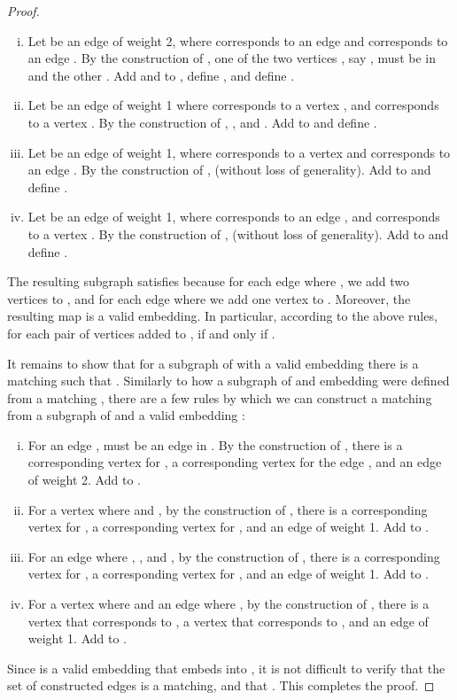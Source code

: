 \documentclass[11pt]{article}
\begin{document}
\begin{proof}
\begin{enumerate}[(i)]
  \item Let  be an edge of weight 2, where  corresponds to an edge  and  corresponds to an edge . By the construction of , one of the two vertices , say , must be in  and the other .  Add  and  to , define , and define .
  \item Let  be an edge of weight 1 where  corresponds to a vertex , and  corresponds to a vertex .  By the construction of , , and .  Add  to  and define .
  \item Let  be an edge of weight 1, where  corresponds to a vertex  and  corresponds to an edge . By the construction of ,  (without loss of generality).  Add  to  and define .
  \item Let  be an edge of weight 1, where  corresponds to an edge , and  corresponds to a vertex .  By the construction of ,  (without loss of generality).  Add  to  and define .
\end{enumerate}

The resulting subgraph  satisfies  because for each edge  where , we add two vertices to , and for each edge  where  we add one vertex to . Moreover, the resulting map  is a valid embedding. In particular, according to the above rules, for each pair of vertices  added to ,  if and only if .

It remains to show that for a subgraph  of  with a valid embedding  there is a matching  such that .  Similarly to how a subgraph  of  and embedding  were defined from a matching , there are a few rules by which we can construct a matching  from a subgraph  of  and a valid embedding :

\begin{enumerate}[(i)]
  \item For an edge ,  must be an edge in . By the construction of , there is a corresponding vertex  for , a corresponding vertex  for the edge , and an edge  of weight 2.  Add  to .

  \item For a vertex  where  and , by the construction of , there is a corresponding vertex  for , a corresponding vertex  for , and an edge  of weight 1.  Add  to .

  \item For an edge  where , , and , by the construction of , there is a corresponding vertex  for , a corresponding vertex  for , and an edge  of weight 1.  Add  to .

  \item For a vertex  where  and an edge  where , by the construction of , there is a vertex  that corresponds to , a vertex  that corresponds to , and an edge  of weight 1.  Add  to .
\end{enumerate}

Since  is a valid embedding that embeds  into , it is not difficult to verify that the set of constructed edges  is a matching, and that . This completes the proof. \end{proof}
\end{document}
